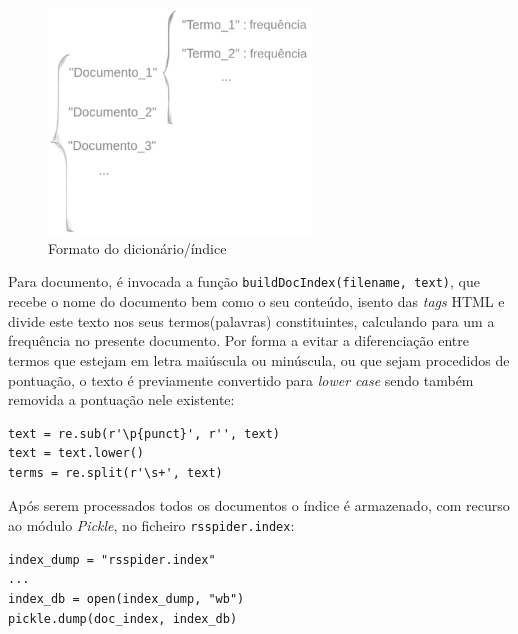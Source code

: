 \documentclass{article}
\begin{document}
\begin{figure}[H]
    \centering
    \includegraphics[width=7cm]{formato_dicionario.png}
    \caption{Formato do dicionário/índice}
\end{figure}

Para documento, é invocada a função \texttt{buildDocIndex(filename, text)}, que recebe o nome do documento bem como o seu conteúdo, isento das \textit{tags} HTML e
divide este texto nos seus termos(palavras) constituintes, calculando para um a frequência no presente documento. Por forma a evitar a diferenciação entre termos
que estejam em letra maiúscula ou minúscula, ou que sejam procedidos de pontuação, o texto é previamente convertido para \textit{lower case} sendo também removida
a pontuação nele existente:

\begin{verbatim}
text = re.sub(r'\p{punct}', r'', text)
text = text.lower()
terms = re.split(r'\s+', text) 
\end{verbatim}

Após serem processados todos os documentos o índice é armazenado, com recurso ao módulo \textit{Pickle}, no ficheiro \texttt{rsspider.index}:

\begin{verbatim}
index_dump = "rsspider.index"
...
index_db = open(index_dump, "wb")
pickle.dump(doc_index, index_db) 
\end{verbatim}
\end{document}
